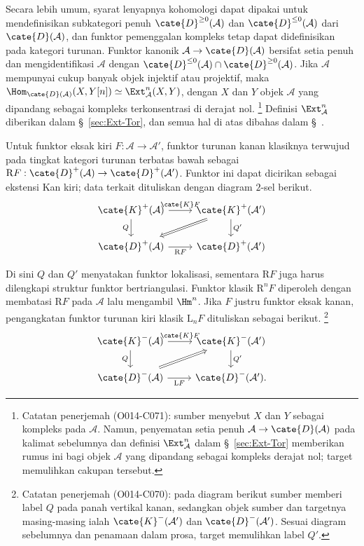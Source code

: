Secara lebih umum, syarat lenyapnya kohomologi dapat dipakai untuk
mendefinisikan subkategori penuh $\cate{D}^{\geq0}(\mathcal{A})$ dan
$\cate{D}^{\leq0}(\mathcal{A})$ dari $\cate{D}(\mathcal{A})$, dan funktor
pemenggalan kompleks tetap dapat didefinisikan pada kategori turunan.
Funktor kanonik $\mathcal{A}\to\cate{D}(\mathcal{A})$ bersifat setia penuh dan
mengidentifikasi $\mathcal{A}$ dengan
$\cate{D}^{\leq0}(\mathcal{A})\cap\cate{D}^{\geq0}(\mathcal{A})$. Jika
$\mathcal{A}$ mempunyai cukup banyak objek injektif atau projektif, maka
$\Hom_{\cate{D}(\mathcal{A})}(X,Y[n])\simeq
\Ext^n_{\mathcal{A}}(X,Y)$, dengan $X$ dan $Y$ objek $\mathcal{A}$ yang
dipandang sebagai kompleks terkonsentrasi di derajat nol.%
\footnote{Catatan penerjemah (O014-C071): sumber menyebut $X$ dan $Y$ sebagai
kompleks pada $\mathcal{A}$. Namun, penyematan setia penuh
$\mathcal{A}\to\cate{D}(\mathcal{A})$ pada kalimat sebelumnya dan definisi
$\Ext^n_{\mathcal{A}}$ dalam \S~\ref{sec:Ext-Tor} memberikan rumus ini bagi
objek $\mathcal{A}$ yang dipandang sebagai kompleks derajat nol; target
memulihkan cakupan tersebut.}
Definisi $\Ext^n_{\mathcal{A}}$ diberikan dalam \S~\ref{sec:Ext-Tor}, dan
semua hal di atas dibahas dalam \S~.

Untuk funktor eksak kiri $F:\mathcal{A}\to\mathcal{A}'$, funktor turunan
kanan klasiknya terwujud pada tingkat kategori turunan terbatas bawah sebagai
$\mathrm{R}F:\cate{D}^+(\mathcal{A})\to\cate{D}^+(\mathcal{A}')$. Funktor
ini dapat dicirikan sebagai ekstensi Kan kiri; data terkait dituliskan dengan
diagram $2$-sel berikut.
\[\begin{tikzcd}
	\cate{K}^+(\mathcal{A}) \arrow[r, "{\cate{K}F}"] \arrow[d, "Q"'] &
	\cate{K}^+(\mathcal{A}') \arrow[d, "{Q'}"] \arrow[Rightarrow, ld] \\
	\cate{D}^+(\mathcal{A}) \arrow[r, "{\mathrm{R}F}"'] &
	\cate{D}^+(\mathcal{A}')
\end{tikzcd}\]

Di sini $Q$ dan $Q'$ menyatakan funktor lokalisasi, sementara
$\mathrm{R}F$ juga harus dilengkapi struktur funktor bertriangulasi. Funktor
klasik $\mathrm{R}^nF$ diperoleh dengan membatasi $\mathrm{R}F$ pada
$\mathcal{A}$ lalu mengambil $\Hm^n$. Jika $F$ justru funktor eksak kanan,
pengangkatan funktor turunan kiri klasik $\mathrm{L}_nF$ dituliskan sebagai
berikut.%
\footnote{Catatan penerjemah (O014-C070): pada diagram berikut sumber memberi
label $Q$ pada panah vertikal kanan, sedangkan objek sumber dan targetnya
masing-masing ialah $\cate{K}^-(\mathcal{A}')$ dan
$\cate{D}^-(\mathcal{A}')$. Sesuai diagram sebelumnya dan penamaan dalam
prosa, target memulihkan label $Q'$.}
\[\begin{tikzcd}
	\cate{K}^-(\mathcal{A}) \arrow[r, "{\cate{K}F}"] \arrow[d, "Q"'] &
	\cate{K}^-(\mathcal{A}') \arrow[d, "{Q'}"] \\
	\cate{D}^-(\mathcal{A}) \arrow[r, "{\mathrm{L}F}"']
	\arrow[ru, Rightarrow] & \cate{D}^-(\mathcal{A}').
\end{tikzcd}\]

